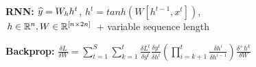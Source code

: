 \textbf{RNN:} $\widehat{y} = W_{h} h^t$, $h^t = tanh(W [h^{t-1}, x^t])$,\\ $h\in \mathbb{R}^n, W \in \mathbb{R}^{[n \times 2n]}$
+ variable sequence length\\

\textbf{Backprop:} $\frac{\delta L}{\delta W} 
= \sum_{t=1}^S \sum_{k=1}^t \frac{\delta L^t}{\delta y^t} \frac{\delta y^t}{\delta h^t} (\prod_{i = k+1}^t \frac{\delta h^i}{\delta h^{i-1}})\frac{\delta^+ h^k}{\delta W}$\\

